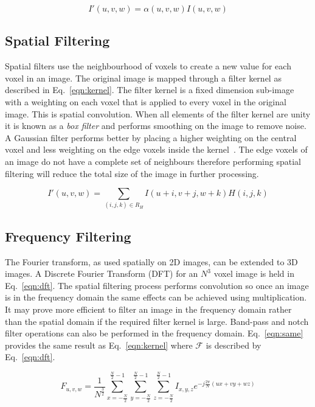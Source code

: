 \documentclass[journal]{IEEEtran}
\begin{document}
\begin{equation}
	I'(u,v,w) = \alpha(u,v,w)I(u,v,w)
	\label{eqn:point} 
\end{equation}



\subsection{Spatial Filtering}
\label{sec:spatial}
Spatial filters use the neighbourhood of voxels to create a new value for each voxel in an image. 
The original image is mapped through a filter kernel as described in Eq.~\eqref{eqn:kernel}.
The filter kernel is a fixed dimension sub-image with a weighting on each voxel that is applied to every voxel in the original image.
This is spatial convolution.
When all elements of the filter kernel are unity it is known as a \emph{box filter} and performs smoothing on the image to remove noise.
A Gaussian filter performs better by placing a higher weighting on the central voxel and less weighting on the edge voxels inside the kernel~\cite{lohmann1998volumetric}.
The edge voxels of an image do not have a complete set of neighbours therefore performing spatial filtering will reduce the total size of the image in further processing.

\begin{equation}
	I'(u,v,w) = \sum\limits_{(i,j,k) \in R_H} I(u + i,v + j, w + k)H(i,j,k)
	\label{eqn:kernel} 
\end{equation}



\subsection{Frequency Filtering}
The Fourier transform, as used spatially on 2D images, can be extended to 3D images.
A Discrete Fourier Transform (DFT) for an $N^3$ voxel image is held in Eq.~\eqref{eqn:dft}.
The spatial filtering process performs convolution so once an image is in the frequency domain the same effects can be achieved using multiplication.
It may prove more efficient to filter an image in the frequency domain rather than the spatial domain if the required filter kernel is large.
Band-pass and notch filter operations can also be performed in the frequency domain.
Eq.~\eqref{eqn:same} provides the same result as Eq.~\eqref{eqn:kernel} where $\mathcal{F}$ is described by Eq.~\eqref{eqn:dft}.

\begin{equation}
	F_{u,v,w} = \frac{1}{N^{\frac{3}{2}}} \sum\limits_{x=-\frac{N}{2}}^{\frac{N}{2}-1}\sum\limits_{y=-\frac{N}{2}}^{\frac{N}{2}-1}\sum\limits_{z=-\frac{N}{2}}^{\frac{N}{2}-1}I_{x,y,z}e^{-j\frac{2\pi}{N}(ux + vy + wz)}
	\label{eqn:dft} 
\end{equation}
\end{document}
